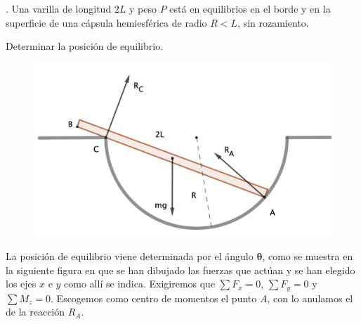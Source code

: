 \begin{prob}
\begin{multicols}{2}.
Una varilla de longitud $2L$ y peso $P$ está en equilibrios en el borde y en la superficie de una cápsula hemiesférica de radio $R<L$, sin rozamiento. 

Determinar la posición de equilibrio.	
\begin{figure}[H]
	\centering
	\includegraphics[width=.55\textwidth]{imagenes/imagenes06/T06IM13.png}
\end{figure}
\end{multicols}	
\end{prob} 

La posición de equilibrio viene determinada por el ángulo $\boldsymbol{\theta}$, como se muestra en la siguiente figura en que se han dibujado las fuerzas que actúan y se han elegido los ejes $x$ e $y$ como allí se indica. Exigiremos que $\sum F_x=0$, $\sum F_y=0$ y $\sum M_z=0$. Escogemos como centro de momentos el punto $A$, con lo anulamos el de la reacción $R_A$.

